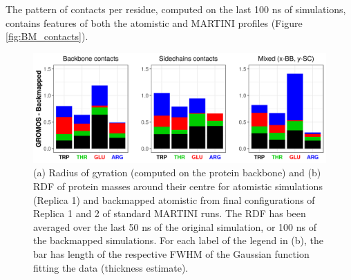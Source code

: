 The pattern of contacts per residue, computed on the last 100 ns of simulations, contains features of both the atomistic and MARTINI profiles (Figure \ref{fig:BM_contacts}).
%
\begin{figure}
\centering
\vspace{1cm}
\caption[Atomistic backmapped simulations: R$_g$ and RDF]{(a) Radius of gyration (computed on the protein backbone) and (b) RDF of protein masses around their centre for atomistic simulations (Replica 1) and backmapped atomistic from final configurations of Replica 1 and 2 of standard MARTINI runs. The RDF has been averaged over the last 50 ns of the original simulation, or 100 ns of the backmapped simulations. For each label of the legend in (b), the bar has length of the respective FWHM of the Gaussian function fitting the data (thickness estimate). }
\label{fig:backmap}
\vspace{1.5cm}
\centering
\includegraphics[width=0.95\linewidth]{3results_capsule/pics/contacts_BM.png} 

\end{figure}
